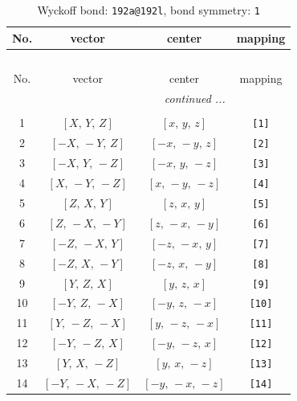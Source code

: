 \documentclass[fleqn,8pt]{jsarticle}
\begin{document}
\begin{longtable}{cccc}
\caption{Wyckoff bond: {\tt 192a@192l}, bond symmetry: {\tt 1}}
 \\
 \hline \hline
No. & vector & center & mapping \\ \hline \endfirsthead

\multicolumn{3}{l}{\tablename\ \thetable{}} \\
 \hline \hline
No. & vector & center & mapping \\ \hline \endhead

 \hline \hline
\multicolumn{3}{r}{\footnotesize\it continued ...} \\ \endfoot

 \hline \hline
\multicolumn{3}{r}{} \\ \endlastfoot

1 & $\left[ X,\, Y,\, Z \right]$ & $\left[ x,\, y,\, z \right]$ & {\tt [1]} \\ \hline
2 & $\left[ - X,\, - Y,\, Z \right]$ & $\left[ - x,\, - y,\, z \right]$ & {\tt [2]} \\ \hline
3 & $\left[ - X,\, Y,\, - Z \right]$ & $\left[ - x,\, y,\, - z \right]$ & {\tt [3]} \\ \hline
4 & $\left[ X,\, - Y,\, - Z \right]$ & $\left[ x,\, - y,\, - z \right]$ & {\tt [4]} \\ \hline
5 & $\left[ Z,\, X,\, Y \right]$ & $\left[ z,\, x,\, y \right]$ & {\tt [5]} \\ \hline
6 & $\left[ Z,\, - X,\, - Y \right]$ & $\left[ z,\, - x,\, - y \right]$ & {\tt [6]} \\ \hline
7 & $\left[ - Z,\, - X,\, Y \right]$ & $\left[ - z,\, - x,\, y \right]$ & {\tt [7]} \\ \hline
8 & $\left[ - Z,\, X,\, - Y \right]$ & $\left[ - z,\, x,\, - y \right]$ & {\tt [8]} \\ \hline
9 & $\left[ Y,\, Z,\, X \right]$ & $\left[ y,\, z,\, x \right]$ & {\tt [9]} \\ \hline
10 & $\left[ - Y,\, Z,\, - X \right]$ & $\left[ - y,\, z,\, - x \right]$ & {\tt [10]} \\ \hline
11 & $\left[ Y,\, - Z,\, - X \right]$ & $\left[ y,\, - z,\, - x \right]$ & {\tt [11]} \\ \hline
12 & $\left[ - Y,\, - Z,\, X \right]$ & $\left[ - y,\, - z,\, x \right]$ & {\tt [12]} \\ \hline
13 & $\left[ Y,\, X,\, - Z \right]$ & $\left[ y,\, x,\, - z \right]$ & {\tt [13]} \\ \hline
14 & $\left[ - Y,\, - X,\, - Z \right]$ & $\left[ - y,\, - x,\, - z \right]$ & {\tt [14]} \\ \hline

\end{longtable}
\end{document}
